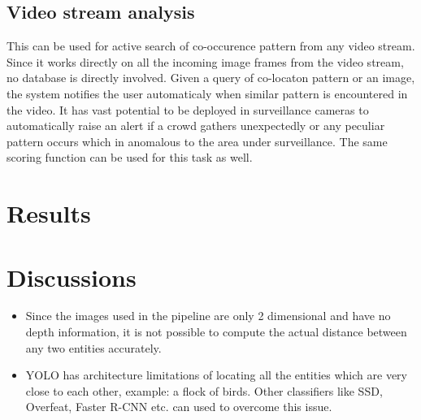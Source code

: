 \documentclass[conference]{IEEEtran}
\begin{document}
{    \subsection{Video stream analysis}
    This can be used for active search of co-occurence pattern from any video stream. Since it works directly on all the incoming image frames from the video stream, no database is directly involved. Given a query of co-locaton pattern or an image, the system notifies the user automaticaly when similar pattern is encountered in the video. It has vast potential to be deployed in surveillance cameras to automatically raise an alert if a crowd gathers unexpectedly or any peculiar pattern occurs which in anomalous to the area under surveillance. The same scoring function can be used for this task as well.

\section{Results}


\section{Discussions}
    \begin{itemize}
        \item Since the images used in the pipeline are only 2 dimensional and have no depth information, it is not possible to compute the actual distance between any two entities accurately.
        \item YOLO has architecture limitations of locating all the entities which are very close to each other, example: a flock of birds. Other classifiers like SSD\cite{ssd}, Overfeat\cite{overfeat}, Faster R-CNN \cite{faster-rcnn} etc. can  used to overcome this issue.
    \end{itemize}

}
\end{document}
